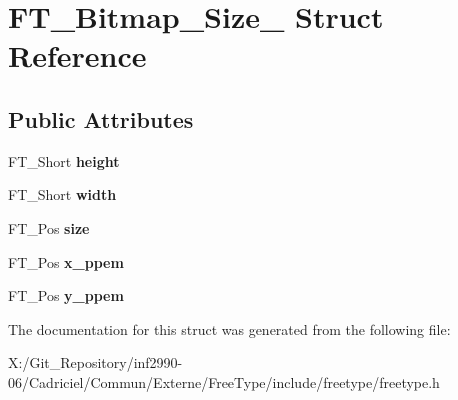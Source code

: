 \hypertarget{struct_f_t___bitmap___size__}{\section{F\-T\-\_\-\-Bitmap\-\_\-\-Size\-\_\- Struct Reference}
\label{struct_f_t___bitmap___size__}
}
\subsection*{Public Attributes}
\begin{DoxyCompactItemize}
\item 
\hypertarget{struct_f_t___bitmap___size___adf2f24039b458ff4674712886f242262}{F\-T\-\_\-\-Short {\bfseries height}}\label{struct_f_t___bitmap___size___adf2f24039b458ff4674712886f242262}

\item 
\hypertarget{struct_f_t___bitmap___size___ab9da94223f75a89a649d1e6d018b17f1}{F\-T\-\_\-\-Short {\bfseries width}}\label{struct_f_t___bitmap___size___ab9da94223f75a89a649d1e6d018b17f1}

\item 
\hypertarget{struct_f_t___bitmap___size___a1db23a6220fb6bcb712430821a6e5352}{F\-T\-\_\-\-Pos {\bfseries size}}\label{struct_f_t___bitmap___size___a1db23a6220fb6bcb712430821a6e5352}

\item 
\hypertarget{struct_f_t___bitmap___size___a6f877a792d2dc93328037c928979215f}{F\-T\-\_\-\-Pos {\bfseries x\-\_\-ppem}}\label{struct_f_t___bitmap___size___a6f877a792d2dc93328037c928979215f}

\item 
\hypertarget{struct_f_t___bitmap___size___a60d4d003d09fd57505f69f39e31e19c1}{F\-T\-\_\-\-Pos {\bfseries y\-\_\-ppem}}\label{struct_f_t___bitmap___size___a60d4d003d09fd57505f69f39e31e19c1}

\end{DoxyCompactItemize}


The documentation for this struct was generated from the following file\-:\begin{DoxyCompactItemize}
\item 
X\-:/\-Git\-\_\-\-Repository/inf2990-\/06/\-Cadriciel/\-Commun/\-Externe/\-Free\-Type/include/freetype/freetype.\-h\end{DoxyCompactItemize}
